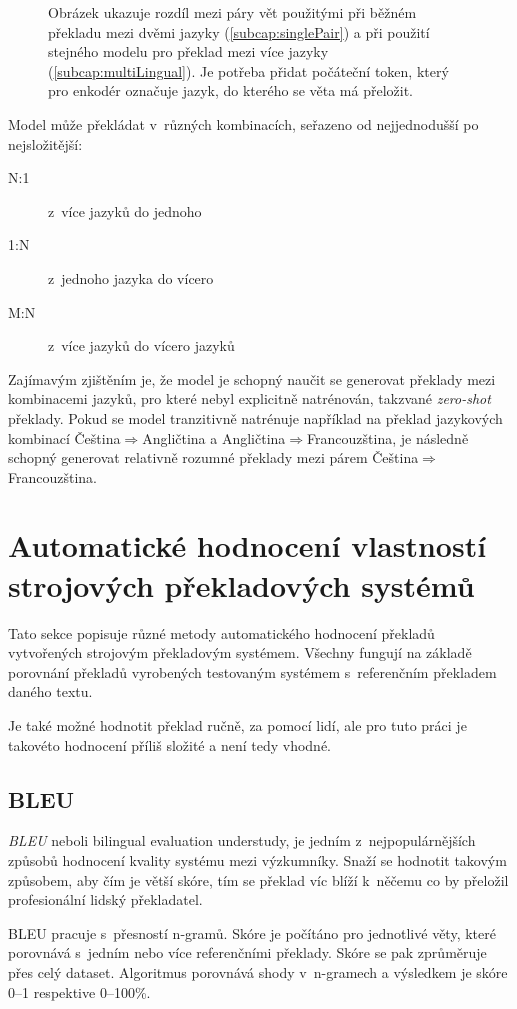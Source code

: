 \begin{figure}[H]
	\caption{Obrázek ukazuje rozdíl mezi páry vět použitými při běžném překladu mezi dvěmi jazyky (\ref{subcap:singlePair}) a při použití stejného modelu pro překlad mezi více jazyky (\ref{subcap:multiLingual}). Je potřeba přidat počáteční token, který pro enkodér označuje jazyk, do kterého se věta má přeložit.}
	\label{figure:multiLingDataset}
\end{figure}

Model může překládat v~různých kombinacích, seřazeno od nejjednodušší po nejsložitější:
\begin{description}
  \item[N:1] z~více jazyků do jednoho
  \item[1:N] z~jednoho jazyka do vícero
  \item[M:N] z~více jazyků do vícero jazyků
\end{description}

Zajímavým zjištěním je, že model je schopný naučit se generovat překlady mezi kombinacemi jazyků, pro které nebyl explicitně natrénován, takzvané \emph{zero-shot} překlady. Pokud se model tranzitivně natrénuje například na překlad jazykových kombinací Čeština$\Rightarrow$Angličtina a Angličtina$\Rightarrow$Francouzština, je následně schopný generovat relativně rozumné překlady mezi párem Čeština$\Rightarrow$Francouzština.


\section{Automatické hodnocení vlastností strojových překladových systémů}
Tato sekce popisuje různé metody automatického hodnocení překladů vytvořených strojovým překladovým systémem. Všechny fungují na základě porovnání překladů vyrobených testovaným systémem s~referenčním překladem daného textu.

Je také možné hodnotit překlad ručně, za pomocí lidí, ale pro tuto práci je takovéto hodnocení příliš složité a není tedy vhodné.

\subsection{BLEU} \label{subsection:bleu}
\emph{BLEU} \cite{BLEU} neboli bilingual evaluation understudy, je jedním z~nejpopulárnějších způsobů hodnocení kvality systému mezi výzkumníky. Snaží se hodnotit takovým způsobem, aby čím je větší skóre, tím se překlad víc blíží k~něčemu co by přeložil profesionální lidský překladatel.

BLEU pracuje s~přesností n-gramů. Skóre je počítáno pro jednotlivé věty, které porovnává s~jedním nebo více referenčními překlady. Skóre se pak zprůměruje přes celý dataset. Algoritmus porovnává shody v~n-gramech a výsledkem je skóre 0--1 respektive 0--100\%.

